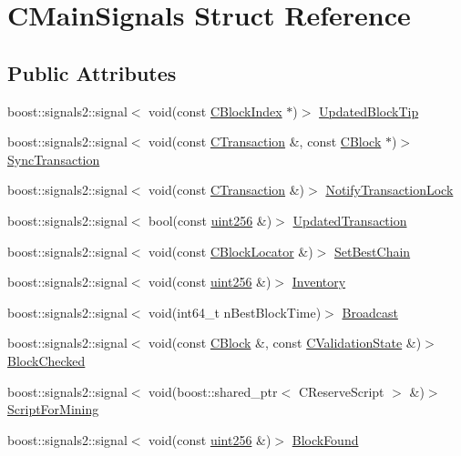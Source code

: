 \hypertarget{struct_c_main_signals}{}\section{C\+Main\+Signals Struct Reference}
\label{struct_c_main_signals}
\subsection*{Public Attributes}
\begin{DoxyCompactItemize}
\item 
boost\+::signals2\+::signal$<$ void(const \mbox{\hyperlink{class_c_block_index}{C\+Block\+Index}} $\ast$)$>$ \mbox{\hyperlink{struct_c_main_signals_a0380ea185992a8ee3572b5cf2aaa7677}{Updated\+Block\+Tip}}
\item 
boost\+::signals2\+::signal$<$ void(const \mbox{\hyperlink{class_c_transaction}{C\+Transaction}} \&, const \mbox{\hyperlink{class_c_block}{C\+Block}} $\ast$)$>$ \mbox{\hyperlink{struct_c_main_signals_a7ced7f332ed90d57110a78ad50d5a60f}{Sync\+Transaction}}
\item 
boost\+::signals2\+::signal$<$ void(const \mbox{\hyperlink{class_c_transaction}{C\+Transaction}} \&)$>$ \mbox{\hyperlink{struct_c_main_signals_a8323c4bfc6811c30abd2e3ff8aacbbaf}{Notify\+Transaction\+Lock}}
\item 
boost\+::signals2\+::signal$<$ bool(const \mbox{\hyperlink{classuint256}{uint256}} \&)$>$ \mbox{\hyperlink{struct_c_main_signals_a5c4626fe1ae15530b27a29cde74ed9c2}{Updated\+Transaction}}
\item 
boost\+::signals2\+::signal$<$ void(const \mbox{\hyperlink{struct_c_block_locator}{C\+Block\+Locator}} \&)$>$ \mbox{\hyperlink{struct_c_main_signals_a11f2f18522ff7aa672eb5cc8c1f397b2}{Set\+Best\+Chain}}
\item 
boost\+::signals2\+::signal$<$ void(const \mbox{\hyperlink{classuint256}{uint256}} \&)$>$ \mbox{\hyperlink{struct_c_main_signals_a2f8f94d91265dc946e97614042698a7b}{Inventory}}
\item 
boost\+::signals2\+::signal$<$ void(int64\+\_\+t n\+Best\+Block\+Time)$>$ \mbox{\hyperlink{struct_c_main_signals_a57ba54e641838bc03d0bbda30796c0c9}{Broadcast}}
\item 
boost\+::signals2\+::signal$<$ void(const \mbox{\hyperlink{class_c_block}{C\+Block}} \&, const \mbox{\hyperlink{class_c_validation_state}{C\+Validation\+State}} \&)$>$ \mbox{\hyperlink{struct_c_main_signals_a9419bb09211f46bdc7f214e9d94f1bd7}{Block\+Checked}}
\item 
boost\+::signals2\+::signal$<$ void(boost\+::shared\+\_\+ptr$<$ C\+Reserve\+Script $>$ \&)$>$ \mbox{\hyperlink{struct_c_main_signals_a459b58e6ee3b3c064439c665cfc8b28d}{Script\+For\+Mining}}
\item 
boost\+::signals2\+::signal$<$ void(const \mbox{\hyperlink{classuint256}{uint256}} \&)$>$ \mbox{\hyperlink{struct_c_main_signals_a27cc5668c440a9d451f7f661370dbc61}{Block\+Found}}
\end{DoxyCompactItemize}


